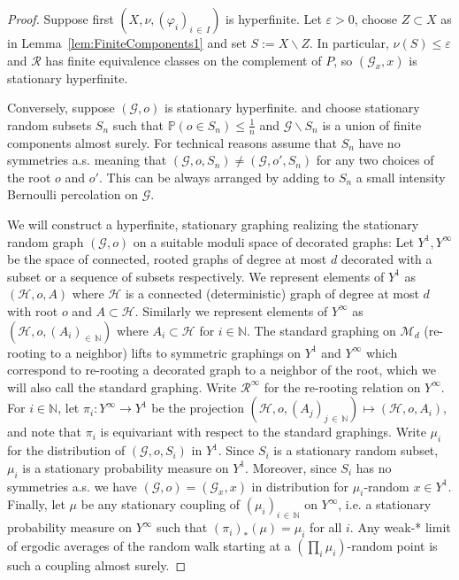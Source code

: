 \documentclass[AHL,Unicode,longabstracts,published]{cedram}
\newcommand{\bbN}{\mathbb{N}}
\newcommand{\bbP}{\mathbb{P}}
\newcommand{\calR}{\mathcal{R}}
\newcommand{\calH}{\mathcal{H}}
\newcommand{\calM}{\mathcal{M}}
\newcommand{\calG}{\mathcal{G}}
\begin{document}
\begin{proof}
Suppose first $(X,\nu,(\varphi_i)_{i\,\in\,I})$ is hyperfinite. Let $\varepsilon>0$, choose $Z\subset X$ as in Lemma~\ref{lem:FiniteComponents1} and set $S:=X\backslash Z$. In particular, $\nu(S)\leq \varepsilon$ and $\calR$ has finite equivalence classes on the complement of $P$, so $(\calG_x, x)$ is stationary hyperfinite.

Conversely, suppose $(\calG,o)$ is stationary hyperfinite. and choose stationary random subsets $S_n$ such that $\bbP(o\in S_n)\leq \frac{1}{n}$ and $\calG \backslash S_n$ is a union of finite components almost surely. For technical reasons assume that $S_n$ have no symmetries a.s. meaning that $(\calG,o,S_n)\neq (\calG,o',S_n)$ for any two choices of the root $o$ and $o'$. This can be always arranged by adding to $S_n$ a small intensity Bernoulli percolation on $\calG$.

We will construct a hyperfinite, stationary graphing realizing the stationary random graph $(\calG, o)$ on a suitable moduli space of decorated graphs: Let $Y^1,Y^\infty$ be the space of connected, rooted graphs of degree at most $d$ decorated with a subset or a sequence of subsets respectively. We represent elements of $Y^1$ as $(\calH,o,A)$ where $\calH$ is a connected (deterministic) graph of degree at most $d$ with root $o$ and $A\subset \calH$. Similarly we represent elements of $Y^\infty$ as $(\calH,o,(A_i)_{\in\,\bbN})$ where $A_i\subset \calH$ for $i\in\bbN$. The standard graphing on $\calM_d$ (re-rooting to a neighbor) lifts to symmetric graphings on $Y^1$ and $Y^\infty$ which correspond to re-rooting a decorated graph to a neighbor of the root, which we will also call the standard graphing. Write $\calR^\infty$ for the re-rooting relation on $Y^\infty$. For $i\in\bbN$, let $\pi_i\colon Y^\infty\to Y^1$ be the projection $(\calH,o,(A_j)_{j\,\in\,\bbN})\mapsto (\calH,o,A_i)$, and note that $\pi_i$ is equivariant with respect to the standard graphings. Write $\mu_i$ for the distribution of $(\calG,o, S_i)$ in $Y^1$. Since $S_i$ is a stationary random subset, $\mu_i$ is a stationary probability measure on $Y^1$. Moreover, since $S_i$ has no symmetries a.s. we have $(\calG,o)=(\calG_x,x)$ in distribution for $\mu_i$-random $x\in Y^1$. Finally, let $\mu$ be any stationary coupling of $(\mu_i)_{i\,\in\,\bbN}$ on $Y^\infty$, i.e. a stationary probability measure on $Y^\infty$ such that $(\pi_i)_*(\mu)=\mu_i$ for all $i$. Any weak-* limit of ergodic averages of the random walk starting at a $(\prod_i \mu_i)$-random point is such a coupling almost surely.


\end{proof}
\end{document}
